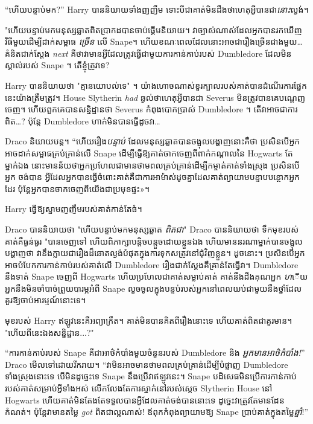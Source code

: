 {{{“ហើយបន្ទាប់មក?” Harry បាននិយាយទាំងញញឹម ទោះបីជាគាត់មិនដឹងថាហេតុអ្វីបានជា\emph{នោះ}ល្ងង់។

"ហើយបន្ទាប់មកមនុស្សឆ្លាតពិតប្រាកដបានចាប់ផ្តើមនិយាយ។ វាច្បាស់ណាស់ដែលអ្នកបានរកឃើញវិធីមួយដើម្បីដាក់សម្ពាធ \emph{ច្រើន} លើ Snape។ ហើយខណៈពេលដែលនោះអាចជារឿងច្រើនជាងមួយ… គំនិតជាក់ស្តែង \emph{next} គឺថាវាមានអ្វីដែលត្រូវធ្វើជាមួយការកាន់កាប់របស់ Dumbledore ដែលមិនស្គាល់របស់ Snape ។ តើខ្ញុំត្រូវទេ?

Harry បាននិយាយថា "គ្មានយោបល់ទេ" ។ យ៉ាងហោចណាស់ខួរក្បាលរបស់គាត់បានដំណើរការផ្នែកនេះយ៉ាងត្រឹមត្រូវ។ House Slytherin \emph{had} ឆ្ងល់ថាហេតុអ្វីបានជា Severus មិនត្រូវបានគេបណ្តេញចេញ។ ហើយពួកគេបានសន្និដ្ឋានថា Severus កំពុងបោកប្រាស់ Dumbledore ។ តើ​វា​អាច​ជា​ការ​ពិត…? ប៉ុន្តែ Dumbledore ហាក់​មិន​បាន​ធ្វើ​ដូច​វា…

Draco និយាយ​បន្ត។ “ហើយរឿង\emph{បន្ទាប់} ដែលមនុស្សឆ្លាតបានចង្អុលបង្ហាញនោះគឺថា ប្រសិនបើអ្នកអាចដាក់សម្ពាធគ្រប់គ្រាន់លើ Snape ដើម្បីធ្វើឱ្យគាត់ចាកចេញពីពាក់កណ្តាលនៃ Hogwarts តែម្នាក់ឯង នោះមានន័យថាអ្នកប្រហែលជាមានថាមពលគ្រប់គ្រាន់ដើម្បីកម្ចាត់គាត់ទាំងស្រុង ប្រសិនបើអ្នក ចង់បាន អ្វី​ដែល​អ្នក​បាន​ធ្វើ​ចំពោះ​គាត់​គឺ​ជា​ការ​អាម៉ាស់​ដូច​គ្នា​ដែល​គាត់​ព្យាយាម​បន្ទាប​បន្ថោក​អ្នក​ដែរ ប៉ុន្តែ​អ្នក​បាន​ចាក​ចេញ​ពី​យើង​ជា​ប្រមុខ​ផ្ទះ»។

Harry ធ្វើឱ្យស្នាមញញឹមរបស់គាត់កាន់តែធំ។

Draco បាននិយាយថា "ហើយបន្ទាប់មកមនុស្សឆ្លាត \emph{ពិតជា}" Draco បាននិយាយថា ទឹកមុខរបស់គាត់គឺធ្ងន់ធ្ងរ "បានចេញទៅ ហើយពិភាក្សាបន្តិចបន្តួចដោយខ្លួនឯង ហើយមាននរណាម្នាក់បានចង្អុលបង្ហាញថា វានឹងក្លាយជារឿងដ៏ឆោតល្ងង់បំផុតក្នុងការទុកសត្រូវនៅជុំវិញខ្លួន។ ដូចនោះ។ ប្រសិនបើអ្នកអាចបំបែកការកាន់កាប់របស់គាត់លើ Dumbledore រឿងជាក់ស្តែងគឺគ្រាន់តែធ្វើវា។ Dumbledore នឹងទាត់ Snape ចេញពី Hogwarts ហើយប្រហែលជាគាត់សម្លាប់គាត់ គាត់នឹងដឹងគុណអ្នក \emph ហើយអ្នកនឹងមិនចាំបាច់ព្រួយបារម្ភអំពី Snape លួចចូលក្នុងបន្ទប់របស់អ្នកនៅពេលយប់ជាមួយនឹងថ្នាំដែលគួរឱ្យចាប់អារម្មណ៍នោះទេ។

មុខរបស់ Harry ឥឡូវនេះគឺអព្យាក្រឹត។ គាត់មិនបានគិតពីរឿងនោះទេ ហើយគាត់ពិតជាគួរមាន។ "ហើយពីនេះឯងសន្និដ្ឋាន...?"

“ការកាន់កាប់របស់ Snape គឺជាអាថ៌កំបាំងមួយចំនួនរបស់ Dumbledore និង \emph{ អ្នកមានអាថ៌កំបាំង!}” Draco មើលទៅដោយរីករាយ។ “វាមិនអាចមានថាមពលគ្រប់គ្រាន់ដើម្បីបំផ្លាញ Dumbledore ទាំងស្រុងនោះទេ បើមិនដូច្នេះទេ Snape នឹងប្រើវាឥឡូវនេះ។ Snape បដិសេធមិនប្រើការកាន់កាប់របស់គាត់សម្រាប់អ្វីទាំងអស់ លើកលែងតែការស្នាក់នៅរបស់ស្តេច Slytherin House នៅ Hogwarts ហើយគាត់មិនតែងតែទទួលបានអ្វីដែលគាត់ចង់បាននោះទេ ដូច្នេះវាត្រូវតែមានដែនកំណត់។ ប៉ុន្តែវាមានតម្លៃ \emph{got} ពិតជាល្អណាស់! ឪពុកកំពុងព្យាយាមឱ្យ Snape ប្រាប់គាត់ក្នុងតម្លៃ\emph{ឆ្នាំ}!”

}}}
